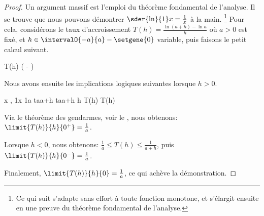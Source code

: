 \begin{proof}
    Un argument massif est l'emploi du théorème fondamental de l'analyse.
    Il se trouve que nous pouvons démontrer $\sder{\ln}{1} x = \frac1x$ à la main.%
    \footnote{
        Ce qui suit s'adapte sans effort à toute fonction monotone, et s'élargit ensuite en une preuve du théorème fondamental de l'analyse.
    }
    Pour cela, considérons le taux d'accroissement $T(h) = \frac{\ln(a+h) - \ln a}{h}$ où $a > 0$ est fixé,
    et
    $h \in \intervalO{-a}{a} - \setgene{0}$ variable,
    puis
    faisons le petit calcul suivant.

    \begin{stepcalc}[style=sar]
        T(h)
    \explnext{}
         \Big(
             - 
        \Big)
         
    \end{stepcalc}

    Nous avons ensuite les implications logiques suivantes lorsque $h > 0$.

    \begin{stepcalc}[style=ar*, ope=\implies]
    \explnext{}
        \forall x \in {},
         \leq \dfrac1x \leq \dfrac1a
        \leq {}      {t}{a}{a+h}
        \leq {}      {t}{a}{a+h}
    \explnext{}
         \leq h T(h) \leq {}
         \leq T(h)\leq {}
    \end{stepcalc}

    Via le théorème des gendarmes, voir le , nous obtenons:
    $\limit{T(h)}{h}{0^+} = \frac1a$.

    Lorsque $h < 0$, nous obtenons:
    $\frac{1}{a} \leq T(h) \leq \frac{1}{a+h}$,
    puis
    $\limit{T(h)}{h}{0^-} = \frac1a$.

    Finalement,
    $\limit{T(h)}{h}{0} = \frac1a$, ce qui achève la démonstration.
\end{proof}
